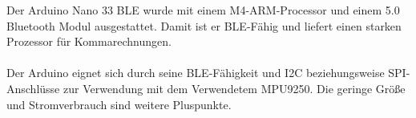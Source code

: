 Der Arduino Nano 33 BLE wurde mit einem M4-ARM-Processor und einem 5.0 
Bluetooth Modul ausgestattet. Damit ist er BLE-Fähig und liefert einen starken
Prozessor für Kommarechnungen. \\
\\
Der Arduino eignet sich durch seine BLE-Fähigkeit und I2C beziehungsweise
SPI-Anschlüsse zur Verwendung mit dem Verwendetem MPU9250. Die geringe Größe
und Stromverbrauch sind weitere Pluspunkte.
